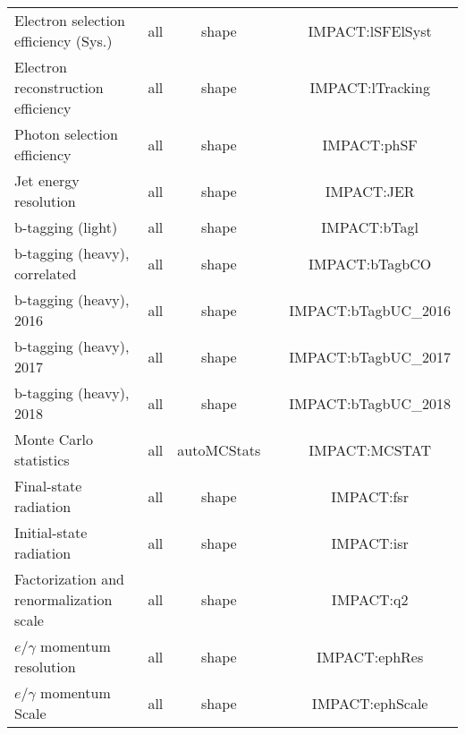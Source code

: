\begin{table}
\begin{tabular}{l|c|c|c|c}
      Electron selection efficiency (Sys.)                & all                   & shape             &                     & IMPACT:lSFElSyst  \\
      Electron reconstruction efficiency                  & all                   & shape             &                     & IMPACT:lTracking  \\
      Photon selection efficiency                         & all                   & shape             &                     & IMPACT:phSF  \\
      Jet energy resolution                               & all                   & shape             &                     & IMPACT:JER  \\
      b-tagging (light)                                   & all                   & shape             &                     & IMPACT:bTagl  \\
      b-tagging (heavy), correlated                       & all                   & shape             &                     & IMPACT:bTagbCO  \\
      b-tagging (heavy), 2016                             & all                   & shape             &                     & IMPACT:bTagbUC_2016  \\
      b-tagging (heavy), 2017                             & all                   & shape             &                     & IMPACT:bTagbUC_2017  \\
      b-tagging (heavy), 2018                             & all                   & shape             &                     & IMPACT:bTagbUC_2018  \\
      Monte Carlo statistics                              & all                   & autoMCStats       &                     & IMPACT:MCSTAT  \\
      Final-state radiation                               & all                   & shape             &                     & IMPACT:fsr  \\
      Initial-state radiation                             & all                   & shape             &                     & IMPACT:isr  \\
      Factorization and renormalization scale             & all                   & shape             &                     & IMPACT:q2  \\
      $e/\gamma$ momentum resolution                      & all                   & shape             &                     & IMPACT:ephRes  \\
      $e/\gamma$ momentum Scale                           & all                   & shape             &                     & IMPACT:ephScale  \\

\end{tabular}
\end{table}
